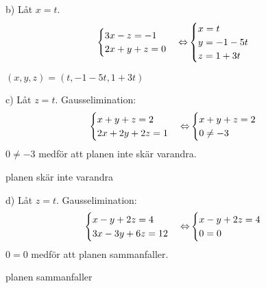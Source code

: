 \begin{task}{b)}
	Låt $x=t$.
	\[\begin{cases}
		3x-z=-1 \\
		2x+y+z=0
	\end{cases} \operatorname{\Leftrightarrow}
	\begin{cases}
		x=t \\
		y=-1-5t \\
		z=1+3t
	\end{cases}\]

	\ans $(x,y,z)=(t,-1-5t,1+3t)$
\end{task}

\begin{task}{c)}
	Låt $z=t$. Gausselimination:
	\[\begin{cases}
		x+y+z=2 \\
		2x+2y+2z=1
	\end{cases} \operatorname{\Leftrightarrow}
	\begin{cases}
		x+y+z=2 \\
		0\neq-3
	\end{cases}\]
	$0\neq-3$ medför att planen inte skär varandra.

	\ans planen skär inte varandra
\end{task}

\begin{task}{d)}
	Låt $z=t$. Gausselimination:
	\[\begin{cases}
		x-y+2z=4 \\
		3x-3y+6z=12
	\end{cases} \operatorname{\Leftrightarrow}
	\begin{cases}
		x-y+2z=4 \\
		0=0
	\end{cases}\]
	$0=0$ medför att planen sammanfaller.

	\ans planen sammanfaller
\end{task}

